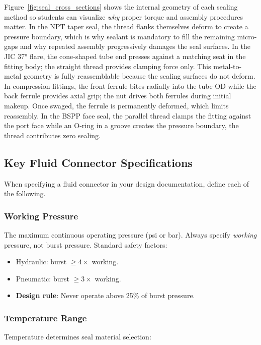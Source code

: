 Figure~\ref{fig:seal_cross_sections} shows the internal geometry of each sealing method so students can visualize \emph{why} proper torque and assembly procedures matter. In the NPT taper seal, the thread flanks themselves deform to create a pressure boundary, which is why sealant is mandatory to fill the remaining micro-gaps and why repeated assembly progressively damages the seal surfaces. In the JIC \ang{37} flare, the cone-shaped tube end presses against a matching seat in the fitting body; the straight thread provides clamping force only. This metal-to-metal geometry is fully reassemblable because the sealing surfaces do not deform. In compression fittings, the front ferrule bites radially into the tube OD while the back ferrule provides axial grip; the nut drives both ferrules during initial makeup. Once swaged, the ferrule is permanently deformed, which limits reassembly. In the BSPP face seal, the parallel thread clamps the fitting against the port face while an O-ring in a groove creates the pressure boundary, the thread contributes zero sealing.


\subsection{Key Fluid Connector Specifications}
\label{sec:fluidspecs}

When specifying a fluid connector in your design documentation, define each of the following.

\subsubsection{Working Pressure}

The maximum continuous operating pressure (psi or bar). Always specify \emph{working} pressure, not burst pressure. Standard safety factors:
\begin{itemize}[nosep,leftmargin=1.5em]
  \item Hydraulic: burst $\geq 4\times$ working.
  \item Pneumatic: burst $\geq 3\times$ working.
  \item \textbf{Design rule}: Never operate above 25\% of burst pressure.
\end{itemize}

\subsubsection{Temperature Range}

Temperature determines seal material selection:

